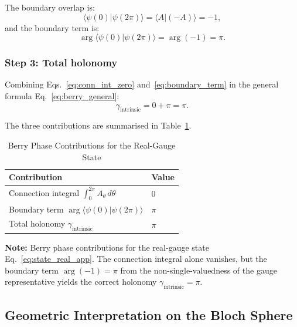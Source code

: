 \documentclass[%
 reprint,
 amsmath,amssymb,
 aps,
 prb,
]{revtex4-2}
\numberwithin{equation}{section}
\theoremstyle{definition}
\theoremstyle{remark}
\begin{document}
The boundary overlap is:
\begin{equation}
\langle\psi(0)|\psi(2\pi)\rangle
= \langle A|(-A)\rangle = -1,
\label{eq:overlap}
\end{equation}
and the boundary term is:
\begin{equation}
\arg\langle\psi(0)|\psi(2\pi)\rangle = \arg(-1) = \pi.
\label{eq:boundary_term}
\end{equation}

\subsubsection{Step 3: Total holonomy}

Combining Eqs.~\eqref{eq:conn_int_zero} and~\eqref{eq:boundary_term} in the general formula Eq.~\eqref{eq:berry_general}:
\begin{equation}
\gamma_{\text{intrinsic}} = 0 + \pi = \pi.
\label{eq:gamma_real_result}
\end{equation}

The three contributions are summarised in Table~\ref{tab:boundary_summary}.

\begin{table}[t!]
\centering
\caption{Berry Phase Contributions for the Real-Gauge State}
\label{tab:boundary_summary}
\renewcommand{\arraystretch}{1.6}
\begin{tabular}{p{10.0cm}p{5.5cm}}
\toprule
\textbf{Contribution} & \textbf{Value} \\
\midrule
Connection integral $\displaystyle\int_0^{2\pi} A_\theta\,d\theta$ & $0$ \\
\addlinespace[0.3cm]
Boundary term $\arg\langle\psi(0)|\psi(2\pi)\rangle$ & $\pi$ \\
\addlinespace[0.3cm]
Total holonomy $\gamma_{\text{intrinsic}}$ & $\pi$ \\
\bottomrule
\end{tabular}
\vspace{0.2cm}
\begin{flushleft}
\footnotesize
\textbf{Note:} Berry phase contributions for the real-gauge state Eq.~\eqref{eq:state_real_app}. The connection integral alone vanishes, but the boundary term $\arg(-1) = \pi$ from the non-single-valuedness of the gauge representative yields the correct holonomy $\gamma_{\text{intrinsic}} = \pi$.
\end{flushleft}
\end{table}

\subsection{Geometric Interpretation on the Bloch Sphere}
\end{document}
